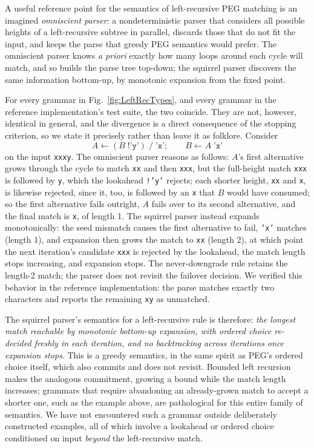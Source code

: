 \documentclass[manuscript]{acmart}
\newcommand{\cd}[1]{\texttt{#1}}
\begin{document}
A useful reference point for the semantics of left-recursive PEG matching is an imagined \emph{omniscient parser}: a nondeterministic parser that considers all possible heights of a left-recursive subtree in parallel, discards those that do not fit the input, and keeps the parse that greedy PEG semantics would prefer. The omniscient parser knows \emph{a priori} exactly how many loops around each cycle will match, and so builds the parse tree top-down; the squirrel parser discovers the same information bottom-up, by monotonic expansion from the fixed point.

For every grammar in Fig.~\ref{fig:LeftRecTypes}, and every grammar in the reference implementation's test suite, the two coincide. They are not, however, identical in general, and the divergence is a direct consequence of the stopping criterion, so we state it precisely rather than leave it as folklore. Consider
\[
A \leftarrow (B \; \texttt{!'y'}) \; / \; \texttt{'x'}; \qquad B \leftarrow A \; \texttt{'x'}
\]
on the input \cd{xxxy}. The omniscient parser reasons as follows: $A$'s first alternative grows through the cycle to match \cd{xx} and then \cd{xxx}, but the full-height match \cd{xxx} is followed by \cd{y}, which the lookahead \cd{!'y'} rejects; each shorter height, \cd{xx} and \cd{x}, is likewise rejected, since it, too, is followed by an \cd{x} that $B$ would have consumed; so the first alternative fails outright, $A$ fails over to its second alternative, and the final match is \cd{x}, of length 1. The squirrel parser instead expands monotonically: the seed mismatch causes the first alternative to fail, \cd{'x'} matches (length 1), and expansion then grows the match to \cd{xx} (length 2), at which point the next iteration's candidate \cd{xxx} is rejected by the lookahead, the match length stops increasing, and expansion stops. The never-downgrade rule retains the length-2 match; the parser does not revisit the failover decision. We verified this behavior in the reference implementation: the parse matches exactly two characters and reports the remaining \cd{xy} as unmatched.

The squirrel parser's semantics for a left-recursive rule is therefore: \emph{the longest match reachable by monotonic bottom-up expansion, with ordered choice re-decided freshly in each iteration, and no backtracking across iterations once expansion stops}. This is a greedy semantics, in the same spirit as PEG's ordered choice itself, which also commits and does not revisit. Bounded left recursion~\cite{medeiros2014} makes the analogous commitment, growing a bound while the match length increases; grammars that require abandoning an already-grown match to accept a shorter one, such as the example above, are pathological for this entire family of semantics. We have not encountered such a grammar outside deliberately constructed examples, all of which involve a lookahead or ordered choice conditioned on input \emph{beyond} the left-recursive match.
\end{document}
